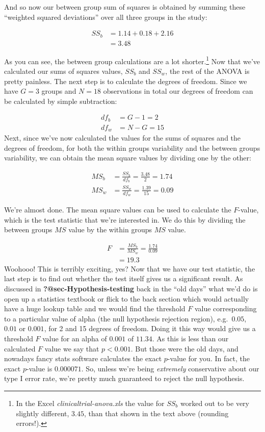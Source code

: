 \documentclass[
  a4paper,
]{book}
\begin{document}
And so now our between group sum of squares is obtained by summing these
``weighted squared deviations'' over all three groups in the study:

\[\begin{aligned} SS_b & = 1.14 + 0.18 + 2.16 \\ &= 3.48 \end{aligned}\]

As you can see, the between group calculations are a lot
shorter.\footnote{In the Excel \emph{clinicaltrial-anova.xls} the value
  for \(SS_b\) worked out to be very slightly different, \(3.45\), than
  that shown in the text above (rounding errors!).} Now that we've
calculated our sums of squares values, \(SS_b\) and \(SS_w\), the rest
of the ANOVA is pretty painless. The next step is to calculate the
degrees of freedom. Since we have \(G = 3\) groups and \(N = 18\)
observations in total our degrees of freedom can be calculated by simple
subtraction:

\[
\begin{split}
df_b & = G-1 = 2 \\
df_w & = N-G = 15
\end{split}
\] Next, since we've now calculated the values for the sums of squares
and the degrees of freedom, for both the within groups variability and
the between groups variability, we can obtain the mean square values by
dividing one by the other:

\[
\begin{split}
MS_b & = \frac{SS_b}{df_b} = \frac{3.48}{2} = 1.74 \\
MS_w & = \frac{SS_w}{df_w} = \frac{1.39}{15} = 0.09
\end{split}
\]

We're almost done. The mean square values can be used to calculate the
\(F\)-value, which is the test statistic that we're interested in. We do
this by dividing the between groups \(MS\) value by the within groups
\(MS\) value.

\[
\begin{split}
F & = \frac{MS_b}{MS_w}  = \frac{1.74}{0.09} \\
& = 19.3
\end{split}
\] Woohooo! This is terribly exciting, yes? Now that we have our test
statistic, the last step is to find out whether the test itself gives us
a significant result. As discussed in \textbf{?@sec-Hypothesis-testing}
back in the ``old days'' what we'd do is open up a statistics textbook
or flick to the back section which would actually have a huge lookup
table and we would find the threshold \(F\) value corresponding to a
particular value of alpha (the null hypothesis rejection region),
e.g.~\(0.05\), \(0.01\) or \(0.001\), for 2 and 15 degrees of freedom.
Doing it this way would give us a threshold \(F\) value for an alpha of
\(0.001\) of \(11.34\). As this is less than our calculated \(F\) value
we say that \(p < 0.001\). But those were the old days, and nowadays
fancy stats software calculates the exact \(p\)-value for you. In fact,
the exact \(p\)-value is \(0.000071\). So, unless we're being
\emph{extremely} conservative about our type I error rate, we're pretty
much guaranteed to reject the null hypothesis.
\end{document}
